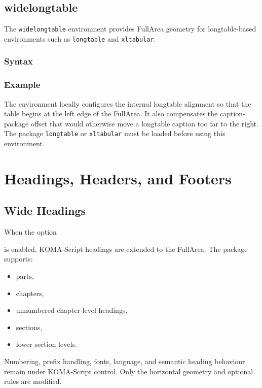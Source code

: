 \documentclass[
11pt,
a4paper,
oneside
]{scrbook}
\begin{document}


	
\section{widelongtable}
	
The \texttt{widelongtable} environment provides FullArea geometry for
longtable-based environments such as \texttt{longtable} and
\texttt{xltabular}.
	
\subsection{Syntax}
	




	
\subsection{Example}
	




The environment locally configures the internal longtable alignment so that
the table begins at the left edge of the FullArea.
It also compensates the caption-package offset that would otherwise move a
longtable caption too far to the right.
The package \texttt{longtable} or \texttt{xltabular} must be loaded before
using this environment.
	
	
\chapter{Headings, Headers, and Footers}
\label{chap:headings}
	
\section{Wide Headings}
	
When the option




is enabled, KOMA-Script headings are extended to the FullArea.
The package supports:
\begin{itemize}
	\item parts,
	\item chapters,
	\item unnumbered chapter-level headings,
	\item sections,
	\item lower section levels.
\end{itemize}
Numbering, prefix handling, fonts, language, and semantic heading behaviour
remain under KOMA-Script control.
Only the horizontal geometry and optional rules are modified.
	
\end{document}

